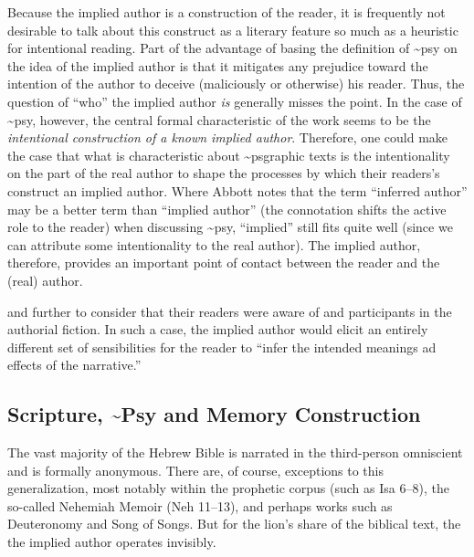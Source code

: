 Because the implied author is a construction of the reader, it is
frequently not desirable to talk about this construct as a literary
feature so much as a heuristic for intentional reading. Part of the
advantage of basing the definition of \textasciitilde{}psy on the idea
of the implied author is that it mitigates any prejudice toward the
intention of the author to deceive (maliciously or otherwise) his
reader. Thus, the question of ``who'' the implied author \emph{is}
generally misses the point. In the case of \textasciitilde{}psy,
however, the central formal characteristic of the work seems to be the
\emph{intentional construction of a known implied author}. Therefore,
one could make the case that what is characteristic about
\textasciitilde{}psgraphic texts is the intentionality on the part of
the real author to shape the processes by which their readers's
construct an implied author. Where Abbott notes that the term ``inferred
author'' may be a better term than ``implied author'' (the connotation
shifts the active role to the reader) when discussing
\textasciitilde{}psy, ``implied'' still fits quite well (since we can
attribute some intentionality to the real author). The implied author,
therefore, provides an important point of contact between the reader and
the (real) author.

and further to consider that their readers were aware of and
participants in the authorial fiction. In such a case, the implied
author would elicit an entirely different set of sensibilities for the
reader to ``infer the intended meanings ad effects of the
narrative.''\autocite[235]{abbott2008}

\hypertarget{scripture-psy-and-memory-construction}{%
\subsection{Scripture, \textasciitilde{}Psy and Memory
Construction}\label{scripture-psy-and-memory-construction}}

The vast majority of the Hebrew Bible is narrated in the third-person
omniscient and is formally anonymous. There are, of course, exceptions
to this generalization, most notably within the prophetic corpus (such
as Isa 6--8), the so-called Nehemiah Memoir (Neh 11--13), and perhaps
works such as Deuteronomy and Song of Songs. But for the lion's share of
the biblical text, the the implied author operates invisibly.

